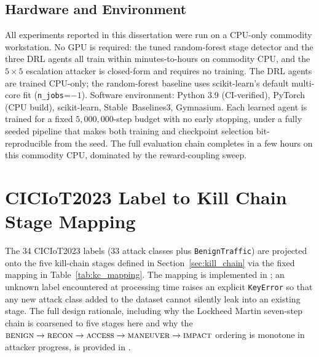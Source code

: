 \section{Hardware and Environment}\label{app:hardware}
All experiments reported in this dissertation were run on a CPU-only commodity workstation. No GPU is required: the tuned random-forest stage detector and the three DRL agents all train within minutes-to-hours on commodity CPU, and the $5\times5$ escalation attacker is closed-form and requires no training. The DRL agents are trained CPU-only; the random-forest baseline uses scikit-learn's default multi-core fit (\texttt{n\_jobs}=$-1$). Software environment: Python 3.9 (CI-verified), PyTorch (CPU build), scikit-learn, Stable~Baselines3, Gymnasium. Each learned agent is trained for a fixed $5{,}000{,}000$-step budget with no early stopping, under a fully seeded pipeline that makes both training and checkpoint selection bit-reproducible from the seed. The full evaluation chain completes in a few hours on this commodity CPU, dominated by the reward-coupling sweep.

\chapter{CICIoT2023 Label to Kill Chain Stage Mapping}\label{app:kc_mapping}

The 34 CICIoT2023 labels (33 attack classes plus \texttt{BenignTraffic}) are projected onto the five kill-chain stages defined in Section~\ref{sec:kill_chain} via the fixed mapping in Table~\ref{tab:kc_mapping}. The mapping is implemented in ; an unknown label encountered at processing time raises an explicit \texttt{KeyError} so that any new attack class added to the dataset cannot silently leak into an existing stage. The full design rationale, including why the Lockheed Martin seven-step chain is coarsened to five stages here and why the $\textsc{benign} \to \textsc{recon} \to \textsc{access} \to \textsc{maneuver} \to \textsc{impact}$ ordering is monotone in attacker progress, is provided in .

